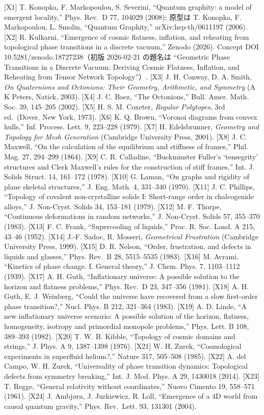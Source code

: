 \documentclass[
  a4paper,
]{ltjsarticle}
\begin{document}
{[}X1{]} T. Konopka, F. Markopoulou, S. Severini, ``Quantum graphity: a
model of emergent locality,'' Phys. Rev.~D 77, 104029 (2008); 原型は T.
Konopka, F. Markopoulou, L. Smolin, ``Quantum Graphity,''
arXiv:hep-th/0611197 (2006). {[}X2{]} R. Kulkarni, ``Emergence of cosmic
flatness, inflation, and reheating from topological phase transitions in
a discrete vacuum,'' Zenodo (2026). Concept DOI
10.5281/zenodo.18727238（初版 2026-02-21 の題名は ``Geometric Phase
Transitions in a Discrete Vacuum: Deriving Cosmic Flatness, Inflation,
and Reheating from Tensor Network Topology''）. {[}X3{]} J. H. Conway,
D. A. Smith, \emph{On Quaternions and Octonions: Their Geometry,
Arithmetic, and Symmetry} (A K Peters, Natick, 2003). {[}X4{]} J. C.
Baez, ``The Octonions,'' Bull. Amer. Math. Soc. 39, 145--205 (2002).
{[}X5{]} H. S. M. Coxeter, \emph{Regular Polytopes}, 3rd ed.~(Dover, New
York, 1973). {[}X6{]} K. Q. Brown, ``Voronoi diagrams from convex
hulls,'' Inf. Process. Lett. 9, 223--228 (1979). {[}X7{]} H.
Edelsbrunner, \emph{Geometry and Topology for Mesh Generation}
(Cambridge University Press, 2001). {[}X8{]} J. C. Maxwell, ``On the
calculation of the equilibrium and stiffness of frames,'' Phil. Mag. 27,
294--299 (1864). {[}X9{]} C. R. Calladine, ``Buckminster Fuller's
`tensegrity' structures and Clerk Maxwell's rules for the construction
of stiff frames,'' Int. J. Solids Struct. 14, 161--172 (1978). {[}X10{]}
G. Laman, ``On graphs and rigidity of plane skeletal structures,'' J.
Eng. Math. 4, 331--340 (1970). {[}X11{]} J. C. Phillips, ``Topology of
covalent non-crystalline solids I: Short-range order in chalcogenide
alloys,'' J. Non-Cryst. Solids 34, 153--181 (1979). {[}X12{]} M. F.
Thorpe, ``Continuous deformations in random networks,'' J. Non-Cryst.
Solids 57, 355--370 (1983). {[}X13{]} F. C. Frank, ``Supercooling of
liquids,'' Proc. R. Soc. Lond. A 215, 43--46 (1952). {[}X14{]} J.-F.
Sadoc, R. Mosseri, \emph{Geometrical Frustration} (Cambridge University
Press, 1999). {[}X15{]} D. R. Nelson, ``Order, frustration, and defects
in liquids and glasses,'' Phys. Rev.~B 28, 5515--5535 (1983). {[}X16{]}
M. Avrami, ``Kinetics of phase change. I. General theory,'' J. Chem.
Phys. 7, 1103--1112 (1939). {[}X17{]} A. H. Guth, ``Inflationary
universe: A possible solution to the horizon and flatness problems,''
Phys. Rev.~D 23, 347--356 (1981). {[}X18{]} A. H. Guth, E. J. Weinberg,
``Could the universe have recovered from a slow first-order phase
transition?,'' Nucl. Phys. B 212, 321--364 (1983). {[}X19{]} A. D.
Linde, ``A new inflationary universe scenario: A possible solution of
the horizon, flatness, homogeneity, isotropy and primordial monopole
problems,'' Phys. Lett. B 108, 389--393 (1982). {[}X20{]} T. W. B.
Kibble, ``Topology of cosmic domains and strings,'' J. Phys. A 9,
1387--1398 (1976). {[}X21{]} W. H. Zurek, ``Cosmological experiments in
superfluid helium?,'' Nature 317, 505--508 (1985). {[}X22{]} A. del
Campo, W. H. Zurek, ``Universality of phase transition dynamics:
Topological defects from symmetry breaking,'' Int. J. Mod. Phys. A 29,
1430018 (2014). {[}X23{]} T. Regge, ``General relativity without
coordinates,'' Nuovo Cimento 19, 558--571 (1961). {[}X24{]} J. Ambjørn,
J. Jurkiewicz, R. Loll, ``Emergence of a 4D world from causal quantum
gravity,'' Phys. Rev.~Lett. 93, 131301 (2004).
\end{document}
